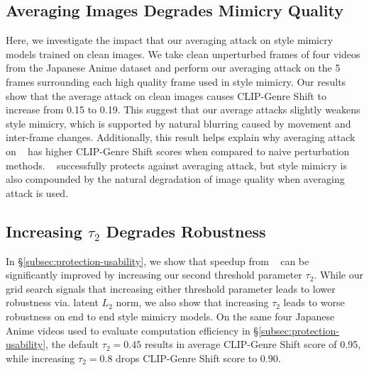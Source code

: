 \subsection{Averaging Images Degrades Mimicry Quality}
Here, we investigate the impact that our averaging attack on style mimicry models trained on clean images. We take clean unperturbed frames of four videos from the Japanese Anime dataset and perform our averaging attack on the 5 frames surrounding each high quality frame used in style mimicry. Our results show that the average attack on clean images causes CLIP-Genre Shift to increase from 0.15 to 0.19. This suggest that our average attacks slightly weakens style mimicry, which is supported by natural blurring caused by movement and inter-frame changes. Additionally, this result helps explain why averaging attack on \system~ has higher CLIP-Genre Shift scores when compared to naive perturbation methods. \system~ successfully protects against averaging attack, but style mimicry is also compounded by the natural degradation of image quality when averaging attack is used.

\subsection{Increasing $\tau_2$ Degrades Robustness}
\label{app:eps-robustness}
In \S\ref{subsec:protection-usability}, we show that speedup from \system~ can be significantly improved by increasing our second threshold parameter $\tau_2$. While our grid search signals that increasing either threshold parameter leads to lower robustness via. latent $L_2$ norm, we also show that increasing $\tau_2$ leads to worse robustness on end to end style mimicry models. On the same four Japanese Anime videos used to evaluate computation efficiency in \S\ref{subsec:protection-usability}, the default $\tau_2 = 0.45$ results in average CLIP-Genre Shift score of 0.95, while increasing $\tau_2 = 0.8$ drops CLIP-Genre Shift score to 0.90. 


